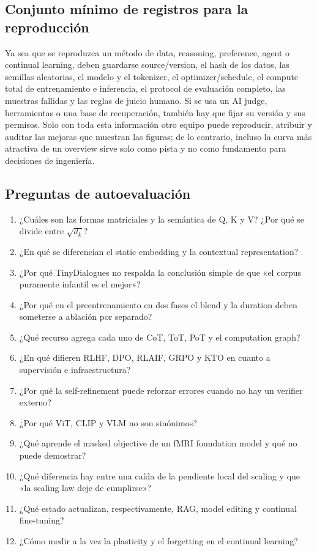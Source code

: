 \documentclass[a4paper]{article}
\begin{document}
\subsection{Conjunto mínimo de registros para la reproducción}

Ya sea que se reproduzca un método de data, reasoning, preference, agent o continual learning, deben guardarse source/version, el hash de los datos, las semillas aleatorias, el modelo y el tokenizer, el optimizer/schedule, el compute total de entrenamiento e inferencia, el protocol de evaluación completo, las muestras fallidas y las reglas de juicio humano. Si se usa un AI judge, herramientas o una base de recuperación, también hay que fijar su versión y sus permisos. Solo con toda esta información otro equipo puede reproducir, atribuir y auditar las mejoras que muestran las figuras; de lo contrario, incluso la curva más atractiva de un overview sirve solo como pista y no como fundamento para decisiones de ingeniería.

\subsection{Preguntas de autoevaluación}

\begin{enumerate}
  \item ¿Cuáles son las formas matriciales y la semántica de Q, K y V? ¿Por qué se divide entre $\sqrt{d_k}$?
  \item ¿En qué se diferencian el static embedding y la contextual representation?
  \item ¿Por qué TinyDialogues no respalda la conclusión simple de que «el corpus puramente infantil es el mejor»?
  \item ¿Por qué en el preentrenamiento en dos fases el blend y la duration deben someterse a ablación por separado?
  \item ¿Qué recurso agrega cada uno de CoT, ToT, PoT y el computation graph?
  \item ¿En qué difieren RLHF, DPO, RLAIF, GRPO y KTO en cuanto a supervisión e infraestructura?
  \item ¿Por qué la self-refinement puede reforzar errores cuando no hay un verifier externo?
  \item ¿Por qué ViT, CLIP y VLM no son sinónimos?
  \item ¿Qué aprende el masked objective de un fMRI foundation model y qué no puede demostrar?
  \item ¿Qué diferencia hay entre una caída de la pendiente local del scaling y que «la scaling law deje de cumplirse»?
  \item ¿Qué estado actualizan, respectivamente, RAG, model editing y continual fine-tuning?
  \item ¿Cómo medir a la vez la plasticity y el forgetting en el continual learning?
\end{enumerate}
\end{document}
